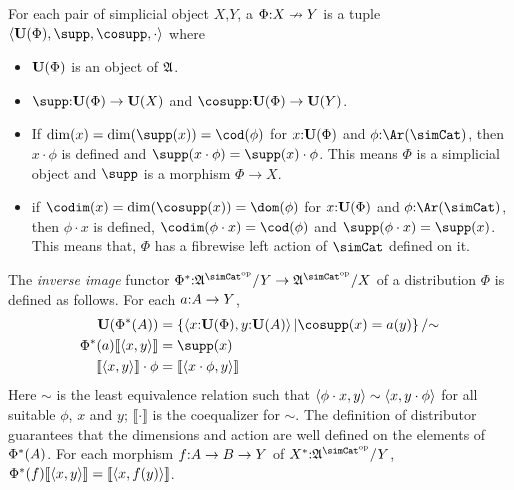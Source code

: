 \documentclass[csh.tex]{subfiles}
\begin{document}
\newcommand\ecof[1]{\llbracket #1 \rrbracket}
\begin{definition} For each pair of simplicial object $X$,$Y$, a  $\Phi\mathord : X\nrightarrow Y$ is a tuple 
$\tuplet{\base(\Phi),\supp,\cosupp,\cdot}$ where 
\begin{itemize}
\item $\mathbf{U}(\Phi)$ is an object of $\mathfrak A$.
\item $\supp\of\base(\Phi)\to\base(X)$ and $\cosupp\of\base(\Phi)\to\base(Y)$.
\item If $\dim(x) = \dim(\supp(x)) = \cod(\phi)$ for $x\mathord :\mathbf{U}(\Phi)$ and $\phi\of\Ar(\simCat)$, then $x\cdot \phi$ is defined and $\supp(x\cdot \phi) = \supp(x)\cdot \phi$. This means $\Phi$ is a simplicial object and $\supp$ is a morphism $\Phi\to X$.
\item if $\codim(x) = \dim(\cosupp(x)) = \dom(\phi)$ for $x\mathord :\mathbf{U}(\Phi)$ and $\phi\of\Ar(\simCat)$, then $\phi\cdot x$ is defined, $\codim(\phi\cdot x) = \cod(\phi)$ and $\supp(\phi\cdot x) = \supp(x)$. This means that, $\Phi$ has a fibrewise left action of $\simCat$ defined on it.
\end{itemize}

The \emph{inverse image} functor $\Phi\ri\of\ambient\s/Y\to\ambient\s/X$ of a distribution $\Phi$ is defined as follows. 
For each $a\mathord : A\to Y$,
\begin{align*}
\base(\Phi\ri(A)) &= \set{\tuplet{x\of\base(\Phi),y\of\base(A)} | \cosupp(x) = a(y) }/\mathord\sim\\
\Phi\ri(a)\ecof{\tuplet{x,y}} &= \supp(x)\\
\ecof{\tuplet{x,y}}\cdot\phi &= \ecof{\tuplet{x\cdot\phi,y}} \\
\end{align*}
Here $\sim$ is the least equivalence relation such that $\left\langle \phi\cdot x,y \right\rangle\sim\left\langle x,y\cdot\phi \right\rangle$ for all suitable $\phi$, $x$ and $y$; $\ecof{\cdot}$ is the coequalizer for $\sim$. The definition of distributor guarantees that the dimensions and action are well defined on the elements of $\Phi^*(A)$.
For each morphism $f\mathord : A\to B \to Y$ of $X\ri\of\ambient\s/Y$, $\Phi\ri(f)\ecof{\tuplet{x,y}} = \ecof{\tuplet{x,f(y)}}$.


\end{definition}
\end{document}
